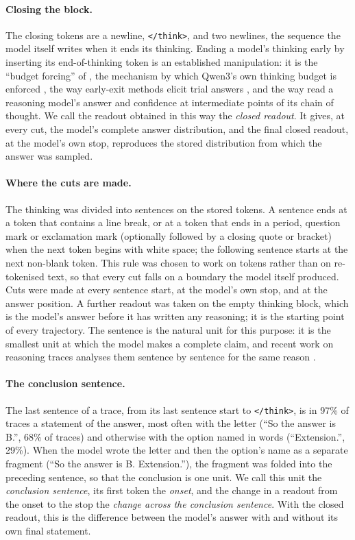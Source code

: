\documentclass[11pt]{article}
\begin{document}
\paragraph{Closing the block.}
The closing tokens are a newline, \texttt{</think>}, and two newlines, the sequence the model itself writes when it ends its thinking. Ending a model's thinking early by inserting its end-of-thinking token is an established manipulation: it is the ``budget forcing'' of \citet{muennighoff2025s1}, the mechanism by which Qwen3's own thinking budget is enforced \citep{yang2025qwen3}, the way early-exit methods elicit trial answers \citep{yang2025deer}, and the way \citet{yoon2025reasoning} read a reasoning model's answer and confidence at intermediate points of its chain of thought. We call the readout obtained in this way the \emph{closed readout}. It gives, at every cut, the model's complete answer distribution, and the final closed readout, at the model's own stop, reproduces the stored distribution from which the answer was sampled.

\paragraph{Where the cuts are made.}
The thinking was divided into sentences on the stored tokens. A sentence ends at a token that contains a line break, or at a token that ends in a period, question mark or exclamation mark (optionally followed by a closing quote or bracket) when the next token begins with white space; the following sentence starts at the next non-blank token. This rule was chosen to work on tokens rather than on re-tokenised text, so that every cut falls on a boundary the model itself produced. Cuts were made at every sentence start, at the model's own stop, and at the answer position. A further readout was taken on the empty thinking block, which is the model's answer before it has written any reasoning; it is the starting point of every trajectory. The sentence is the natural unit for this purpose: it is the smallest unit at which the model makes a complete claim, and recent work on reasoning traces analyses them sentence by sentence for the same reason \citep{bogdan2025thought}.

\paragraph{The conclusion sentence.}
The last sentence of a trace, from its last sentence start to \texttt{</think>}, is in 97\% of traces a statement of the answer, most often with the letter (``So the answer is B.'', 68\% of traces) and otherwise with the option named in words (``Extension.'', 29\%). When the model wrote the letter and then the option's name as a separate fragment (``So the answer is B. Extension.''), the fragment was folded into the preceding sentence, so that the conclusion is one unit. We call this unit the \emph{conclusion sentence}, its first token the \emph{onset}, and the change in a readout from the onset to the stop the \emph{change across the conclusion sentence}. With the closed readout, this is the difference between the model's answer with and without its own final statement.
\end{document}
